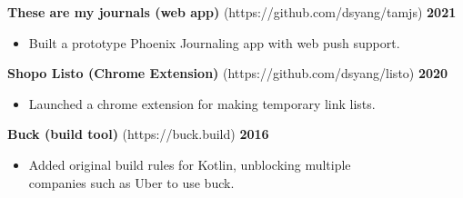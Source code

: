 \documentclass[sectioned]{dsyangres}
\begin{document}
\begin{resume}



\textbf{These are my journals (web app)} (https://github.com/dsyang/tamjs)
\hfill \textbf{2021}
  \begin{itemize} \itemsep -2pt
    \item Built a prototype Phoenix Journaling app with web push support.
  \end{itemize}

\textbf{Shopo Listo (Chrome Extension)} (https://github.com/dsyang/listo)
\hfill \textbf{2020}
  \begin{itemize} \itemsep -2pt
    \item Launched a chrome extension for making temporary link lists.
  \end{itemize}
\textbf{Buck (build tool)} (https://buck.build)
\hfill \textbf{2016}
  \begin{itemize} \itemsep -2pt
    \item Added original build rules for Kotlin, unblocking multiple
      \\ companies such as Uber to use buck.
  \end{itemize}
  

\end{resume}
\end{document}
